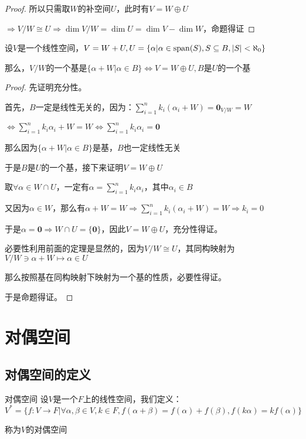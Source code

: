 \documentclass[12pt, a4paper, oneside, UTF8]{ctexbook}
\begin{document}
\begin{para}{0}
\begin{proof}
						所以只需取$W$的补空间$U$，此时有$V=W \oplus U$

						$\Rightarrow V/W \cong U \Rightarrow \dim V/W = \dim U=\dim V-\dim W$，命题得证
					\end{proof}
				\point{}
					\begin{proposition}
						设$V$是一个线性空间，$V=W+U,U = \{\alpha | \alpha \in \operatorname{span}(S),S \subseteq B,|S| < \aleph_0\}$

						那么，$V/W$的一个基是$\{\alpha + W| \alpha \in B\} \Leftrightarrow V=W \oplus U,B$是$U$的一个基
					\end{proposition}
					\begin{proof}
						先证明充分性。

						首先，$B$一定是线性无关的，因为：$\sum\limits_{i=1}^{n} k_i (\alpha_i+ W) = \mathbf{0}_{V/W} = W$

						$\Leftrightarrow \sum\limits_{i=1}^{n} k_i \alpha_i + W = W \Leftrightarrow \sum\limits_{i=1}^{n} k_i \alpha_i = \mathbf{0}$

						那么因为$\{\alpha + W| \alpha \in B\}$是基，$B$也一定线性无关

						于是$B$是$U$的一个基，接下来证明$V=W\oplus U$

						取$\forall \alpha \in W \cap U$，一定有$\alpha = \sum\limits_{i=1}^{n} k_i \alpha_i$，其中$\alpha_i \in B$

						又因为$\alpha \in W$，那么有$\alpha + W = W \Rightarrow \sum\limits_{i=1}^{n} k_i (\alpha_i+ W) = W \Rightarrow k_i = 0$

						于是$\alpha = \mathbf{0} \Rightarrow W \cap U = \{\mathbf{0}\}$，因此$V=W\oplus U$，充分性得证。

						必要性利用前面的定理是显然的，因为$V/W \cong U$，其同构映射为$V/W \ni \alpha + W \mapsto \alpha \in U$

						那么按照基在同构映射下映射为一个基的性质，必要性得证。

						于是命题得证。
					\end{proof}
			\end{para}
	\section{对偶空间}
		\subsection{对偶空间的定义}
			\begin{defn}{对偶空间}{}
				设$V$是一个$F$上的线性空间，我们定义：
				\begin{equation}
					V^* = \{f:V \to F| \forall \alpha ,\beta \in V,k \in F,f(\alpha +\beta )=f(\alpha )+f(\beta ),f(k\alpha )=kf(\alpha )\}
				\end{equation}

				称为$V$的对偶空间
			\end{defn}
\end{document}
